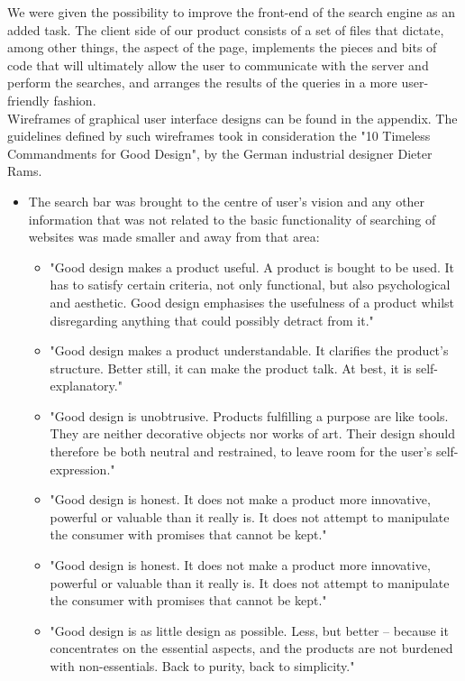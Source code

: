 We were given the possibility to improve the front-end of the search engine as an added task. The client side of our product consists of a set of files that dictate, among other things, the aspect of the page, implements the pieces and bits of code that will ultimately allow the user to communicate with the server and perform the searches, and arranges the results of the queries in a more user-friendly fashion.\\
Wireframes of graphical user interface designs can be found in the appendix. The guidelines defined by such wireframes took in consideration the "10 Timeless Commandments for Good Design", by the German industrial designer Dieter Rams. \citep{domingo:designprinciples}
\begin{itemize}
    \item The search bar was brought to the centre of user's vision and any other information that was not related to the basic functionality of searching of websites was made smaller and away from that area:
    \begin{itemize}
        \item "Good design makes a product useful. A product is bought to be used. It has to satisfy certain criteria, not only functional, but also psychological and aesthetic. Good design emphasises the usefulness of a product whilst disregarding anything that could possibly detract from it." \citep{domingo:designprinciples}
        \item "Good design makes a product understandable. It clarifies the product’s structure. Better still, it can make the product talk. At best, it is self-explanatory." \citep{domingo:designprinciples}
        \item "Good design is unobtrusive. Products fulfilling a purpose are like tools. They are neither decorative objects nor works of art. Their design should therefore be both neutral and restrained, to leave room for the user’s self-expression." \citep{domingo:designprinciples}
        \item "Good design is honest. It does not make a product more innovative, powerful or valuable than it really is. It does not attempt to manipulate the consumer with promises that cannot be kept." \citep{domingo:designprinciples}
        \item "Good design is honest. It does not make a product more innovative, powerful or valuable than it really is. It does not attempt to manipulate the consumer with promises that cannot be kept." \citep{domingo:designprinciples}
        \item "Good design is as little design as possible. Less, but better – because it concentrates on the essential aspects, and the products are not burdened with non-essentials. Back to purity, back to simplicity." \citep{domingo:designprinciples}

\end{itemize}
\end{itemize}
